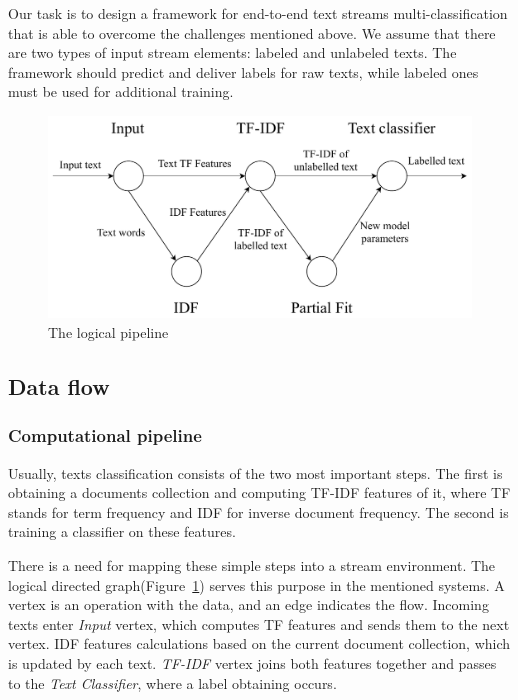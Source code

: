 \label{fs-framework}

Our task is to design a framework for end-to-end text streams multi-classification that is able to overcome the challenges mentioned above. We assume that there are two types of input stream elements: labeled and unlabeled texts. The framework should predict and deliver labels for raw texts, while labeled ones must be used for additional training.

\begin{figure}[htbp]
  \centering
  \includegraphics[scale=0.48]{pics/logical-graph}
  \caption{The logical pipeline}
  \label {logical_graph}
\end{figure}

\subsection{Data flow \label{DF}}

\subsubsection{Computational pipeline}

Usually, texts classification consists of the two most important steps. The first is obtaining a documents collection and computing TF-IDF features of it, where TF stands for term frequency and IDF for inverse document frequency. The second is training a classifier on these features.

There is a need for mapping these simple steps into a stream environment. The logical directed graph(Figure~\ref{logical_graph}) serves this purpose in the mentioned systems. A vertex is an operation with the data, and an edge indicates the flow.  Incoming texts enter {\em Input} vertex, which computes TF features and sends them to the next vertex. IDF features calculations based on the current document collection, which is updated by each text. {\em TF-IDF} vertex joins both features together and passes to the {\em Text Classifier}, where a label obtaining occurs.

